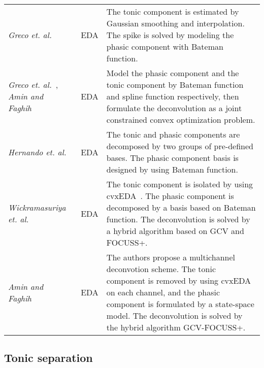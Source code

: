 \documentclass[10pt,conference]{ieeeconf}
\begin{document}
\begin{table*}[htbp]
\begin{tabular}{m{}<{\raggedright}m{}<{\raggedright}m{}}
    \textit{Greco et. al.}~\cite{greco2014electrodermal} & EDA & The tonic component is estimated by Gaussian smoothing and interpolation. The spike is solved by modeling the phasic component with Bateman function. \\ 
    \textit{Greco et. al.}~\cite{greco2015cvxeda}, \textit{Amin and Faghih}~\cite{amin2019tonic} & EDA & Model the phasic component and the tonic component by Bateman function and spline function respectively, then formulate the deconvolution as a joint constrained convex optimization problem. \\ 
    \textit{Hernando et. al.}~\cite{hernando2017feature} & EDA & The tonic and phasic components are decomposed by two groups of pre-defined bases. The phasic component basis is designed by using Bateman function. \\
    \textit{Wickramasuriya et. al.}~\cite{wickramasuriya2019skin} & EDA & The tonic component is isolated by using cvxEDA~\cite{greco2015cvxeda}. The phasic component is decomposed by a basis based on Bateman function. The deconvolution is solved by a hybrid algorithm based on GCV and FOCUSS+. \\
    \textit{Amin and Faghih}~\cite{amin2019robust} & EDA & The authors propose a multichannel deconvotion scheme. The tonic component is removed by using cvxEDA~\cite{greco2015cvxeda} on each channel, and the phasic component is formulated by a state-space model. The deconvolution is solved by the hybrid algorithm GCV-FOCUSS+. \\ \bottomrule
  \end{tabular}
\end{table*}

\subsection{Tonic separation}
 
\end{document}
